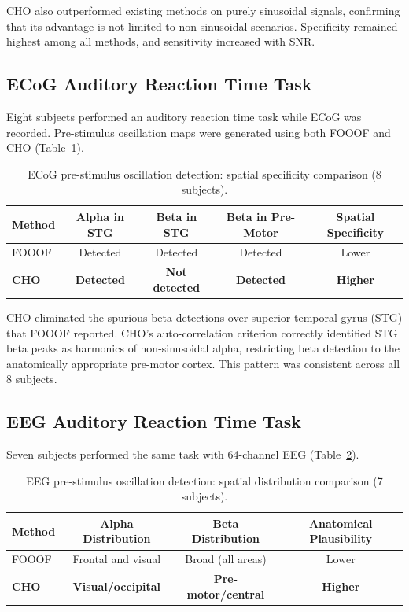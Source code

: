 \documentclass[11pt]{article}
\begin{document}
CHO also outperformed existing methods on purely sinusoidal signals, confirming that its advantage is not limited to non-sinusoidal scenarios. Specificity remained highest among all methods, and sensitivity increased with SNR.

\subsection{ECoG Auditory Reaction Time Task}

Eight subjects performed an auditory reaction time task while ECoG was recorded. Pre-stimulus oscillation maps were generated using both FOOOF and CHO (Table~\ref{tab:ecog}).

\begin{table}[H]
\centering
\caption{ECoG pre-stimulus oscillation detection: spatial specificity comparison (8 subjects).}
\label{tab:ecog}
\begin{tabular}{@{}lcccc@{}}
\toprule
Method & Alpha in STG & Beta in STG & Beta in Pre-Motor & Spatial Specificity \\
\midrule
FOOOF & Detected & Detected & Detected & Lower \\
\textbf{CHO} & \textbf{Detected} & \textbf{Not detected} & \textbf{Detected} & \textbf{Higher} \\
\bottomrule
\end{tabular}
\end{table}

CHO eliminated the spurious beta detections over superior temporal gyrus (STG) that FOOOF reported. CHO's auto-correlation criterion correctly identified STG beta peaks as harmonics of non-sinusoidal alpha, restricting beta detection to the anatomically appropriate pre-motor cortex. This pattern was consistent across all 8 subjects.

\subsection{EEG Auditory Reaction Time Task}

Seven subjects performed the same task with 64-channel EEG (Table~\ref{tab:eeg}).

\begin{table}[H]
\centering
\caption{EEG pre-stimulus oscillation detection: spatial distribution comparison (7 subjects).}
\label{tab:eeg}
\begin{tabular}{@{}lccc@{}}
\toprule
Method & Alpha Distribution & Beta Distribution & Anatomical Plausibility \\
\midrule
FOOOF & Frontal and visual & Broad (all areas) & Lower \\
\textbf{CHO} & \textbf{Visual/occipital} & \textbf{Pre-motor/central} & \textbf{Higher} \\
\bottomrule
\end{tabular}
\end{table}
\end{document}
